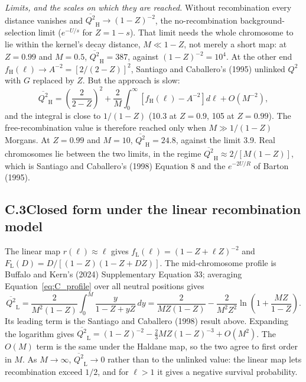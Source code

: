 \documentclass[12pt]{article}
\begin{document}
\medskip
\noindent\textit{Limits, and the scales on which they are reached.} Without recombination every distance vanishes and $\overline{Q^2}_\text{H} \to (1-Z)^{-2}$, the no-recombination background-selection limit ($e^{-U/s}$ for $Z = 1-s$). That limit needs the whole chromosome to lie within the kernel's decay distance, $M \ll 1-Z$, not merely a short map: at $Z = 0.99$ and $M = 0.5$, $\overline{Q^2}_\text{H} = 387$, against $(1-Z)^{-2} = 10^4$. At the other end $f_\text{H}(\ell) \to A^{-2} = [2/(2-Z)]^2$, Santiago and Caballero's (1995) unlinked $Q^2$ with $G$ replaced by $Z$. But the approach is slow:
\begin{equation}
    \overline{Q^2}_\text{H} = \left(\frac{2}{2-Z}\right)^2 + \frac{2}{M}\int_0^\infty \left[f_\text{H}(\ell) - A^{-2}\right]d\ell + O(M^{-2}),
\end{equation}
and the integral is close to $1/(1-Z)$ (10.3 at $Z = 0.9$, 105 at $Z = 0.99$). The free-recombination value is therefore reached only when $M \gg 1/(1-Z)$ Morgans. At $Z = 0.99$ and $M = 10$, $\overline{Q^2}_\text{H} = 24.8$, against the limit 3.9. Real chromosomes lie between the two limits, in the regime $\overline{Q^2}_\text{H} \approx 2/[M(1-Z)]$, which is Santiago and Caballero's (1998) Equation 8 and the $e^{-2U/R}$ of Barton (1995).

\subsection*{C.3\quad Closed form under the linear recombination model}

The linear map $r(\ell) \approx \ell$ gives $f_\text{L}(\ell) = (1-Z+\ell Z)^{-2}$ and $F_\text{L}(D) = D/[(1-Z)(1-Z+DZ)]$. The mid-chromosome profile is Buffalo and Kern's (2024) Supplementary Equation 33; averaging Equation~\eqref{eq:C_profile} over all neutral positions gives
\begin{equation}
    \overline{Q^2}_\text{L} = \frac{2}{M^2(1-Z)}\int_0^M \frac{y}{1-Z+yZ}\,dy = \frac{2}{MZ(1-Z)} - \frac{2}{M^2Z^2}\ln\!\left(1+\frac{MZ}{1-Z}\right).
\label{eq:closed_form}
\end{equation}
Its leading term is the Santiago and Caballero (1998) result above. Expanding the logarithm gives $\overline{Q^2}_\text{L} = (1-Z)^{-2} - \frac{2}{3}MZ(1-Z)^{-3} + O(M^2)$. The $O(M)$ term is the same under the Haldane map, so the two agree to first order in $M$. As $M \to \infty$, $\overline{Q^2}_\text{L} \to 0$ rather than to the unlinked value: the linear map lets recombination exceed $1/2$, and for $\ell > 1$ it gives a negative survival probability.
\end{document}
